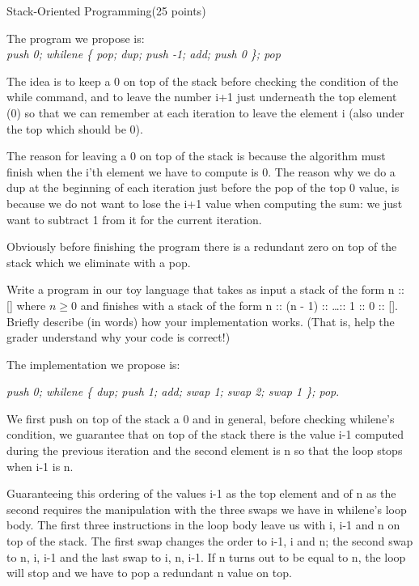 \documentclass{article}
\begin{document}
\begin{question}{Stack-Oriented Programming}{(25 points)}
\begin{subquestion}
The program we propose is:\\
 \emph{push 0; whilene \{ pop; dup; push -1; add; push 0 \}; pop}
 
 The idea is to keep a 0 on top of the stack before checking the condition of the while command, and to leave the number i+1 just underneath the top element (0) so that we can remember at each iteration to leave the element i (also under the top which should be 0).
 
 The reason for leaving a 0 on top of the stack is because the algorithm must finish when the i'th element we have to compute is 0. The reason why we do a dup at the beginning of each iteration just before the pop of the top 0 value, is because we do not want to lose the i+1 value when computing the sum: we just want to subtract 1 from it for the current iteration.
 
 Obviously before finishing the program there is a redundant zero on top of the stack which we eliminate with a pop. 


  \end{subquestion}
  
  \begin{subquestion}
    Write a program in our toy language that takes as input a stack of the form n :: [] where $n \geq 0$ and
   finishes with a stack of the form n :: (n - 1) :: \dots :: 1 :: 0 :: []. Briefly describe (in words) how your
   implementation works. (That is, help the grader understand why your code is correct!)
   
   The implementation we propose is:
   
   \emph{push 0; whilene \{ dup; push 1; add; swap 1; swap 2; swap 1 \}; pop}.
   
   We first push on top of the stack a 0 and in general, before checking whilene's condition, we guarantee that on top of the stack there is the value i-1 computed during the previous iteration and the second element is n so that the loop stops when i-1 is n.
   
   Guaranteeing this ordering of the values i-1 as the top element and of n as the second requires the manipulation with the three swaps we have in whilene's loop body. The first three instructions in the loop body leave us with i, i-1 and n on top of the stack. The first swap changes the order to i-1, i and n; the second swap to n, i, i-1 and the last swap to i, n, i-1. If n turns out to be equal to n, the loop will stop and we have to pop a redundant n value on top.
    

\end{subquestion}
\end{question}
\end{document}
